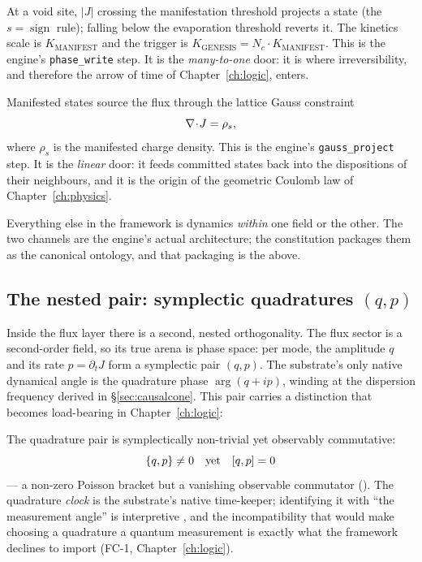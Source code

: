 \begin{description}[leftmargin=1.6em,style=nextline,itemsep=3pt]
  \item[Channel 1 --- Genesis / evaporation (downward, $J\to s$).] At a void site,
    $\lvert J\rvert$ crossing the manifestation threshold projects a state (the
    $s=\operatorname{sign}$ rule); falling below the evaporation threshold reverts
    it. The kinetics scale is $K_{\mathrm{MANIFEST}}$ and the trigger is
    $K_{\mathrm{GENESIS}} = N_c\cdot K_{\mathrm{MANIFEST}}$. This is the engine's
    \texttt{phase\_write} step. It is the \emph{many-to-one} door: it is where
    irreversibility, and therefore the arrow of time of Chapter~\ref{ch:logic},
    enters.
  \item[Channel 2 --- Gauss sourcing (upward, $s\to J$).] Manifested states source
    the flux through the lattice Gauss constraint
    \[
      \nabla\!\cdot\!J = \rho_s ,
    \]
    where $\rho_s$ is the manifested charge density. This is the engine's
    \texttt{gauss\_project} step. It is the \emph{linear} door: it feeds committed
    states back into the dispositions of their neighbours, and it is the origin of
    the geometric Coulomb law of Chapter~\ref{ch:physics}.
\end{description}

Everything else in the framework is dynamics \emph{within} one field or the other.
The two channels are the engine's actual architecture; the constitution packages
them as the canonical ontology, and that packaging is the  above.

\subsection{The nested pair: symplectic quadratures \texorpdfstring{$(q,p)$}{(q,p)}}\label{sec:quadratures}

Inside the flux layer there is a second, nested orthogonality. The flux sector is
a second-order field, so its true arena is phase space: per mode, the amplitude
$q$ and its rate $p=\partial_t J$ form a symplectic pair $(q,p)$. The substrate's
only native dynamical angle is the quadrature phase $\arg(q+ip)$, winding at the
dispersion frequency derived in \S\ref{sec:causalcone}. This pair carries a
distinction that becomes load-bearing in Chapter~\ref{ch:logic}:

\begin{claim}\label{cl:crucial}
The quadrature pair is symplectically non-trivial yet observably commutative:
\[
  \{q,p\}\neq 0 \quad\text{yet}\quad [q,p]=0
\]
--- a non-zero Poisson bracket but a vanishing observable commutator
(). The quadrature \emph{clock} is the substrate's native time-keeper;
identifying it with ``the measurement angle'' is interpretive , and the
incompatibility that would make choosing a quadrature a quantum measurement is
exactly what the framework declines to import (FC-1, Chapter~\ref{ch:logic}).
\end{claim}

